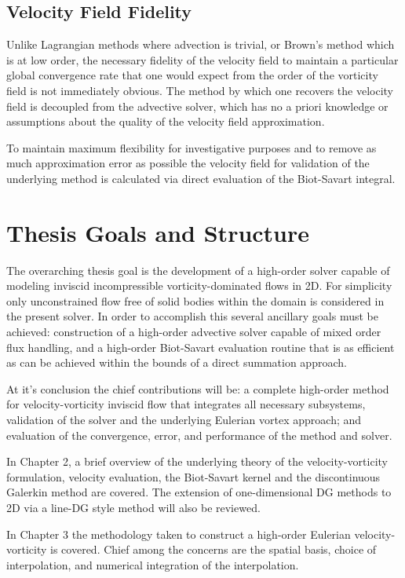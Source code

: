 \documentclass[letterpaper,12pt]{report}
\begin{document}
\subsection{Velocity Field Fidelity}
Unlike Lagrangian methods where advection is trivial, or Brown's method which is at low order, the necessary fidelity of the velocity field to maintain a particular global convergence rate that one would expect from the order of the vorticity field is not immediately obvious. The method by which one recovers the velocity field is decoupled from the advective solver, which has no a priori knowledge or assumptions about the quality of the velocity field approximation. 

To maintain maximum flexibility for investigative purposes and to remove as much approximation error as possible the velocity field for validation of the underlying method is calculated via direct evaluation of the Biot-Savart integral.

\section{Thesis Goals and Structure}
The overarching thesis goal is the development of a high-order solver capable of modeling inviscid incompressible vorticity-dominated flows in 2D. For simplicity only unconstrained flow free of solid bodies within the domain is considered in the present solver. In order to accomplish this several ancillary goals must be achieved: construction of a high-order advective solver capable of mixed order flux handling, and a high-order Biot-Savart evaluation routine that is as efficient as can be achieved within the bounds of a direct summation approach.

At it's conclusion the chief contributions will be: a complete high-order method for velocity-vorticity inviscid flow that integrates all necessary subsystems, validation of the solver and the underlying Eulerian vortex approach; and evaluation of the convergence, error, and performance of the method and solver.

In Chapter 2, a brief overview of the underlying theory of the velocity-vorticity formulation, velocity evaluation, the Biot-Savart  kernel and the discontinuous Galerkin method are covered. The extension of one-dimensional DG methods to 2D via a line-DG \cite{Persson2013} style method will also be reviewed. 

In Chapter 3 the methodology taken to construct a high-order Eulerian velocity-vorticity is covered. Chief among the concerns are the spatial basis, choice of interpolation, and numerical integration of the interpolation.
\end{document}
